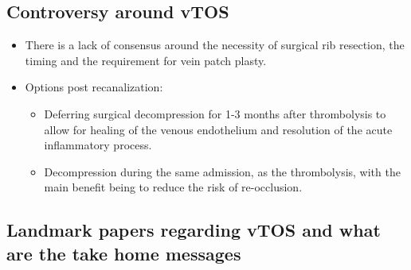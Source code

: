 \documentclass[
]{book}
\begin{document}
\hypertarget{controversy-around-vtos}{%
\subsection{Controversy around vTOS}\label{controversy-around-vtos}}

\begin{itemize}
\item
  There is a lack of consensus around the necessity of surgical rib
  resection, the timing and the requirement for vein patch plasty.
\item
  Options post recanalization:

  \begin{itemize}
  \item
    Deferring surgical decompression for 1-3 months after
    thrombolysis to allow for healing of the venous endothelium and
    resolution of the acute inflammatory process.
    \citet{humphries123ThoracicOutlet2019}
  \item
    Decompression during the same admission, as the thrombolysis,
    with the main benefit being to reduce the risk of re-occlusion.
    \citet{humphries123ThoracicOutlet2019}
  \end{itemize}
\end{itemize}

\hypertarget{landmark-papers-regarding-vtos-and-what-are-the-take-home-messages}{%
\subsection{Landmark papers regarding vTOS and what are the take home messages}\label{landmark-papers-regarding-vtos-and-what-are-the-take-home-messages}}
\end{document}

